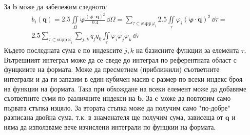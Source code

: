 \documentclass[bulgarian, 12pt]{article}
\begin{document}
\begin{large}
За $\mathbf{b}$ може да забележим следното:
\begin{align*}
  &b_i(\mathbf{q}) = 
  2.5 \iint\limits_{\Omega} \mathbf{\varphi} \frac{(\mathbf{\varphi} \cdot \mathbf{q})^2}{0.4} \,\dd\Omega = 
  \sum_{\tau \subset \mathrm{supp} \,\varphi_i } 2.5 \iint\limits_{\tau} \varphi_i (\mathbf{\varphi} \cdot \mathbf{q})^2 \,\dd\tau =\\
  &2.5 \sum_{\tau \subset \mathrm{supp} \,\varphi_i } \sum_{j, k} q_j q_k \iint\limits_{\tau} \varphi_i \varphi_j \varphi_k \,\dd\tau
\end{align*}
Където последната сума е по индексите $j, k$ на базисните функции за елемента $\tau$. 
Вътрешният интеграл може да се сведе до интеграл по референтната област с фунцкиите на формата.
Може да пресметнем (приближили) съответните интеграли и да ги запазим в един кубичен масив с размер по всеки индекс броя на функции на формата.
Така при обхождане на всеки елемент може да добавяме съответните суми по различните индекси на $\mathbf{b}$.
За $\mathbf{c}$ може да повторим само първата стъпка изцяло. 
За втората стъпка може да получим само "по-добре" разписана двойна сума, т.к. в знаменателя ще получим сума, зависеща от $\mathbf{q}$ и няма да използваме вече изчислени интеграли по фунцкии на формата.


\end{large}
\end{document}
